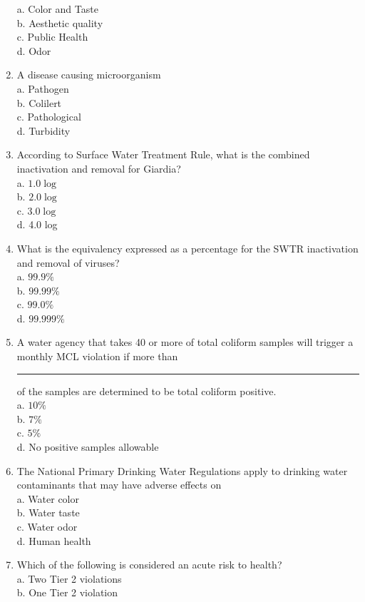 \begin{enumerate}
a. Color and Taste\\
b. Aesthetic quality\\
c. Public Health\\
d. Odor\\
\item A disease causing microorganism\\
a. Pathogen\\
b. Colilert\\
c. Pathological\\
d. Turbidity\\
\item According to Surface Water Treatment Rule, what is the combined inactivation and removal for Giardia?\\
a. $1.0 \log$\\
b. $2.0 \log$\\
c. $3.0 \log$\\
d. 4.0 log\\
\item What is the equivalency expressed as a percentage for the SWTR inactivation and removal of viruses?\\
a. $99.9 \%$\\
b. $99.99 \%$\\
c. $99.0 \%$\\
d. $99.999 \%$\\
\item A water agency that takes 40 or more of total coliform samples will trigger a monthly MCL violation if more than \rule{1.5cm}{0.5pt} of the samples are determined to be total coliform positive.\\
a. $10 \%$\\
b. $7 \%$\\
c. $5 \%$\\
d. No positive samples allowable\\
\item The National Primary Drinking Water Regulations apply to drinking water contaminants that may have adverse effects on\\
a. Water color\\
b. Water taste\\
c. Water odor\\
d. Human health\\
\item Which of the following is considered an acute risk to health?\\
a. Two Tier 2 violations\\
b. One Tier 2 violation\\

\end{enumerate}
